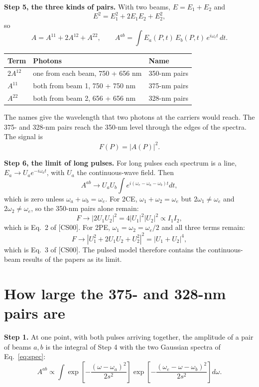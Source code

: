 \documentclass[11pt]{article}
\begin{document}
\textbf{Step 5, the three kinds of pairs.} With two beams, $E = E_1 + E_2$ and
\begin{equation}E^2 = E_1^2 + 2E_1E_2 + E_2^2 ,\end{equation}
so
\begin{equation}A = A^{11} + 2A^{12} + A^{22},\qquad A^{ab} = \int E_a(P,t)\,E_b(P,t)\,e^{i\omega_et}\,dt .\end{equation}
\begin{center}\small\begin{tabular}{lll}\toprule
Term & Photons & Name\\\midrule
$2A^{12}$ & one from each beam, 750 + 656 nm & 350-nm pairs\\
$A^{11}$ & both from beam 1, 750 + 750 nm & 375-nm pairs\\
$A^{22}$ & both from beam 2, 656 + 656 nm & 328-nm pairs\\\bottomrule\end{tabular}\end{center}
The names give the wavelength that two photons at the carriers would reach. The 375- and 328-nm pairs reach the
350-nm level through the edges of the spectra. The signal is
\begin{equation}F(P) = |A(P)|^2 .\end{equation}

\textbf{Step 6, the limit of long pulses.} For long pulses each spectrum is a line, $E_a \to U_a e^{-i\omega_at}$,
with $U_a$ the continuous-wave field. Then
\begin{equation}A^{ab} \to U_aU_b\int e^{i(\omega_e-\omega_a-\omega_b)t}dt ,\end{equation}
which is zero unless $\omega_a + \omega_b = \omega_e$. For 2CE, $\omega_1 + \omega_2 = \omega_e$ but
$2\omega_1 \ne \omega_e$ and $2\omega_2 \ne \omega_e$, so the 350-nm pairs alone remain:
\begin{equation}F \to |2U_1U_2|^2 = 4|U_1|^2|U_2|^2 \propto I_1I_2 ,\end{equation}
which is Eq.~2 of [CS00]. For 2PE, $\omega_1 = \omega_2 = \omega_e/2$ and all three terms remain:
\begin{equation}F \to |U_1^2 + 2U_1U_2 + U_2^2|^2 = |U_1 + U_2|^4 ,\end{equation}
which is Eq.~3 of [CS00]. The pulsed model therefore contains the continuous-beam results of the papers as its
limit.

\section{How large the 375- and 328-nm pairs are}
\textbf{Step 1.} At one point, with both pulses arriving together, the amplitude of a pair of beams $a, b$ is the
integral of Step 4 with the two Gaussian spectra of Eq.~\ref{eq:spec}:
\begin{equation}A^{ab} \propto \int\exp\!\left[-\frac{(\omega-\omega_a)^2}{2s^2}\right]
\exp\!\left[-\frac{(\omega_e-\omega-\omega_b)^2}{2s^2}\right]d\omega .\end{equation}
\end{document}
